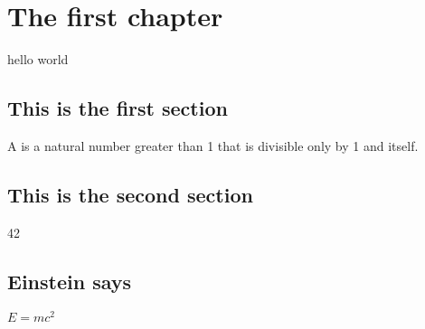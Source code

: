 \chapter{The first chapter}

hello world


\section{This is the first section}

A 
is a natural number greater than 1 that is divisible only by 1 and itself. 


\section{This is the second section}

42


\section{Einstein says}

$E = mc^2$
